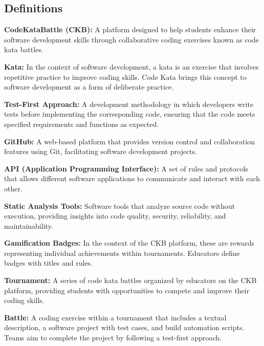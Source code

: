 \subsection{Definitions}
\begin{description}[labelwidth=4em, leftmargin=5em, style=nextline]

    \item \textbf{CodeKataBattle (CKB):} A platform designed to help students enhance their software development skills through collaborative coding exercises known as code kata battles.

    \item \textbf{Kata:} In the context of software development, a kata is an exercise that involves repetitive practice to improve coding skills. Code Kata brings this concept to software development as a form of deliberate practice.

    \item \textbf{Test-First Approach:} A development methodology in which developers write tests before implementing the corresponding code, ensuring that the code meets specified requirements and functions as expected.

    \item \textbf{GitHub:} A web-based platform that provides version control and collaboration features using Git, facilitating software development projects.

    \item \textbf{API (Application Programming Interface):} A set of rules and protocols that allows different software applications to communicate and interact with each other.

    \item \textbf{Static Analysis Tools:} Software tools that analyze source code without execution, providing insights into code quality, security, reliability, and maintainability.

    \item \textbf{Gamification Badges:} In the context of the CKB platform, these are rewards representing individual achievements within tournaments. Educators define badges with titles and rules.

    \item \textbf{Tournament:} A series of code kata battles organized by educators on the CKB platform, providing students with opportunities to compete and improve their coding skills.

    \item \textbf{Battle:} A coding exercise within a tournament that includes a textual description, a software project with test cases, and build automation scripts. Teams aim to complete the project by following a test-first approach.


\end{description}
